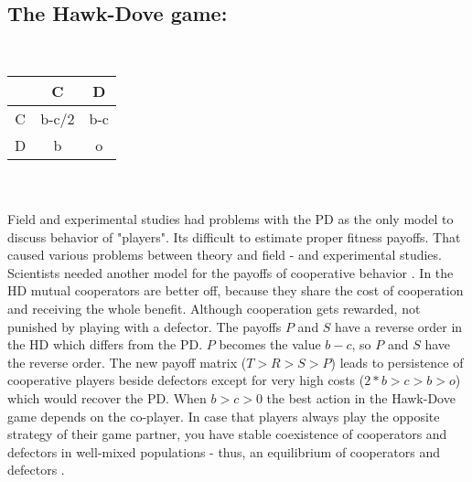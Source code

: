 \subsection{The Hawk-Dove game:}
\newline\\
\begin{tabular}{|c|c|c|}
	\hline  & C & D \\ 
	\hline C & b-c/2 & b-c \\ 
	\hline D & b & o \\ 
	\hline 
\end{tabular} \\
\newline\\ 
Field and experimental studies had problems with the PD as the only model to discuss behavior of "players". Its difficult to estimate proper fitness payoffs. That caused various problems between theory and field - and experimental studies. Scientists needed another model for the payoffs of cooperative behavior \citep{milinski1997, nowak1992}. In the HD mutual cooperators are better off, because they share the cost of cooperation and receiving the whole benefit. Although cooperation gets rewarded, not punished by playing with a defector. The payoffs $P$ and $S$ have a reverse order in the HD which differs from the PD. $P$ becomes the value $b-c$, so $P$ and $S$ have the reverse order. The new payoff matrix ($T>R>S>P$) leads to persistence of cooperative players beside defectors except for very high costs ($2*b>c>b>o$) which would recover the PD. When $b>c>0$ the best action in the Hawk-Dove game depends on the co-player. In case that players always play the opposite strategy of their game partner, you have stable coexistence of cooperators and defectors in well-mixed populations - thus, an equilibrium of cooperators and defectors \citep{HauertandDoebeli2004}.

